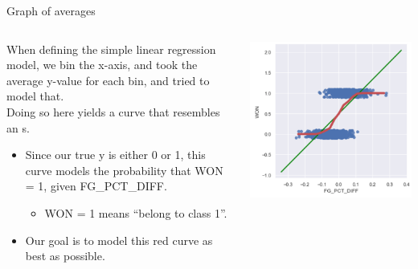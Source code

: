 \documentclass[aspectratio=169]{../latex_main/tntbeamer}  %
\begin{document}
	
		\begin{frame}{Graph of averages}
	    \begin{columns}
	        \begin{column}{.5\textwidth}
	                When defining the simple linear regression model, we bin the x-axis, and took the average y-value for each bin, and tried to model that.\\
	                \bigskip
	                Doing so here yields a curve that resembles an s.
	                \begin{itemize}
	                    \item Since our true y is either 0 or 1, this curve models the probability that WON = 1, given FG\_PCT\_DIFF.
	                    \begin{itemize}
	                        \item WON = 1 means “belong to class 1”.
	                    \end{itemize}
	                    \item Our goal is to model this red curve as best as possible.
	                \end{itemize}
	        \end{column}
	        
	        \begin{column}{.4\textwidth}

	                    \includegraphics[scale=.5]{Bild5}
	        \end{column}
	    \end{columns}
	\end{frame}
	
\end{document}
